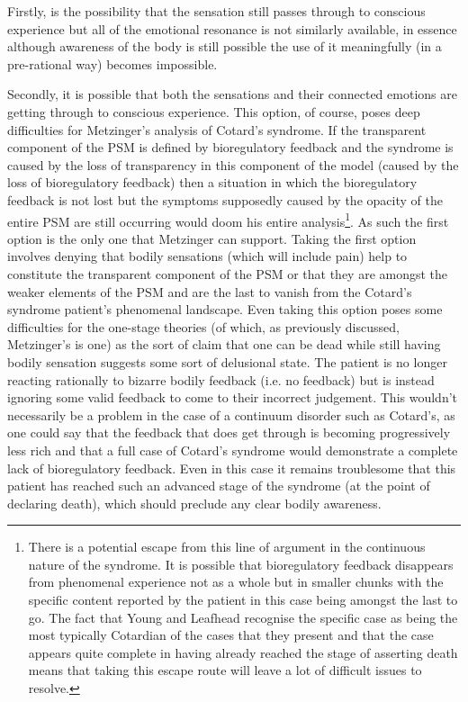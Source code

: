Firstly, is the possibility that the sensation still passes through to conscious experience but all of the emotional resonance is not similarly available, in essence although awareness of the body is still possible the use of it meaningfully (in a pre-rational way) becomes impossible.

Secondly, it is possible that both the sensations and their connected emotions are getting through to conscious experience. This option, of course, poses deep difficulties for Metzinger's analysis of Cotard's syndrome. If the transparent component of the PSM is defined by bioregulatory feedback and the syndrome is caused by the loss of transparency in this component of the model (caused by the loss of bioregulatory feedback) then a situation in which the bioregulatory feedback is not lost but the symptoms supposedly caused by the opacity of the entire PSM are still occurring would doom his entire analysis\footnote{There is a potential escape from this line of argument in the continuous nature of the syndrome. It is possible that bioregulatory feedback disappears from phenomenal experience not as a whole but in smaller chunks with the specific content reported by the patient in this case being amongst the last to go. The fact that Young and Leafhead recognise the specific case as being the most typically Cotardian of the cases that they present and that the case appears quite complete in having already reached the stage of asserting death means that taking this escape route will leave a lot of difficult issues to resolve.}. As such the first option is the only one that Metzinger can support. Taking the first option involves denying that bodily sensations (which will include pain) help to constitute the transparent component of the PSM or that they are amongst the weaker elements of the PSM and are the last to vanish from the Cotard's syndrome patient's phenomenal landscape. Even taking this option poses some difficulties for the one-stage theories (of which, as previously discussed, Metzinger's is one) as the sort of claim that one can be dead while still having bodily sensation suggests some sort of delusional state. The patient is no longer reacting rationally to bizarre bodily feedback (i.e. no feedback) but is instead ignoring some valid feedback to come to their incorrect judgement. This wouldn't necessarily be a problem in the case of a continuum disorder such as Cotard's, as one could say that the feedback that does get through is becoming progressively less rich and that a full case of Cotard's syndrome would demonstrate a complete lack of bioregulatory feedback. Even in this case it remains troublesome that this patient has reached such an advanced stage of the syndrome (at the point of declaring death), which should preclude any clear bodily awareness.

